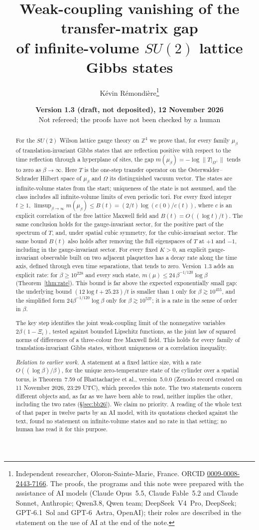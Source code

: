\documentclass[11pt,a4paper]{article}
\title{Weak-coupling vanishing of the transfer-matrix gap\\ of infinite-volume $SU(2)$ lattice Gibbs states}
\author{K\'evin R\'emondi\`ere\thanks{Independent researcher, Oloron-Sainte-Marie, France. ORCID
\href{https://orcid.org/0009-0008-2443-7166}{0009-0008-2443-7166}. The proofs, the programs and this note were prepared with the
assistance of AI models (Claude Opus~5.5, Claude Fable~5.2 and Claude Sonnet, Anthropic; Qwen3.8, Qwen team; DeepSeek~V4~Pro, DeepSeek; GPT-6.1~Sol and
GPT-6~Astra, OpenAI); their roles are described in the
statement on the use of AI at the end of the note.}}
\date{\textbf{Version 1.3 (draft, not deposited), 12 November 2026}\\
\small Not refereed; the proofs have not been checked by a human}
\theoremstyle{plain}
\theoremstyle{definition}
\theoremstyle{remark}
\numberwithin{equation}{section}
\newcommand{\Z}{\mathbb{Z}}
\begin{document}
\maketitle

\begin{abstract}
For the $SU(2)$ Wilson lattice gauge theory on $\Z^4$ we prove that, for every family $\mu_\beta$ of translation-invariant Gibbs states
that are reflection positive with respect to the time reflection through a hyperplane of sites, the gap
$m(\mu_\beta)=-\log\|T|_{\Omega^\perp}\|$ tends to zero as $\beta\to\infty$. Here $T$ is the one-step transfer operator on the
Osterwalder--Schrader Hilbert space of $\mu_\beta$ and $\Omega$ its distinguished vacuum vector. The states are infinite-volume states
from the start; uniqueness of the state is not assumed, and the class includes all infinite-volume limits of even periodic tori.
For every fixed integer $t\ge1$, $\limsup_{\beta\to\infty}m(\mu_\beta)\le B(t)=(2/t)\log(c(0)/c(t))$, where $c$ is an explicit
correlation of the free lattice Maxwell field and $B(t)=O((\log t)/t)$. The same conclusion holds for the gauge-invariant sector, for the
positive part of the spectrum of $T$, and, under spatial cubic symmetry, for the cubic-invariant sector. The same bound $B(t)$ also
holds after removing the full eigenspaces of $T$ at $+1$ and $-1$, including in the gauge-invariant sector. For every fixed $K>0$, an
explicit gauge-invariant observable built on two adjacent plaquettes has a decay rate along the time axis, defined through even time
separations, that tends to zero.
Version~1.3 adds an explicit rate: for $\beta\ge10^{228}$ and every such state, $m(\mu)\le24\,\beta^{-1/120}\log\beta$ (Theorem~\ref{thm:rate}).
This bound is far above the expected exponentially small gap: the underlying bound $(12\log t+25.23)/t$ is smaller than $1$ only for $\beta\gtrsim10^{455}$, and the simplified form $24\beta^{-1/120}\log\beta$ only for $\beta\gtrsim10^{537}$; it is a rate in the sense of order in $\beta$.

The key step identifies the joint weak-coupling limit of the nonnegative variables $2\beta(1-\Xi_i)$, tested against bounded Lipschitz
functions, as the joint law of squared norms of differences of a three-colour free Maxwell field. This holds for every family of
translation-invariant Gibbs states, without uniqueness or a correlation inequality.

\emph{Relation to earlier work.} A statement at a fixed lattice size, with a rate $O((\log\beta)/\beta)$, for the unique zero-temperature state of the cylinder
over a spatial torus, is Theorem~7.59 of Bhattacharjee et al., version~5.0.0 (Zenodo record created on 11 November 2026, 23:29 UTC),
which precedes this note. The two statements concern different objects and, as far as we have been able to read, neither implies the
other, including the two rates (\S\ref{sec:bb26}). We claim no priority. A reading of the whole text of that paper in twelve parts by an AI model, with its quotations checked against the text, found no statement on infinite-volume states and no rate in that setting; no human has read it for this purpose.


\end{abstract}
\end{document}
